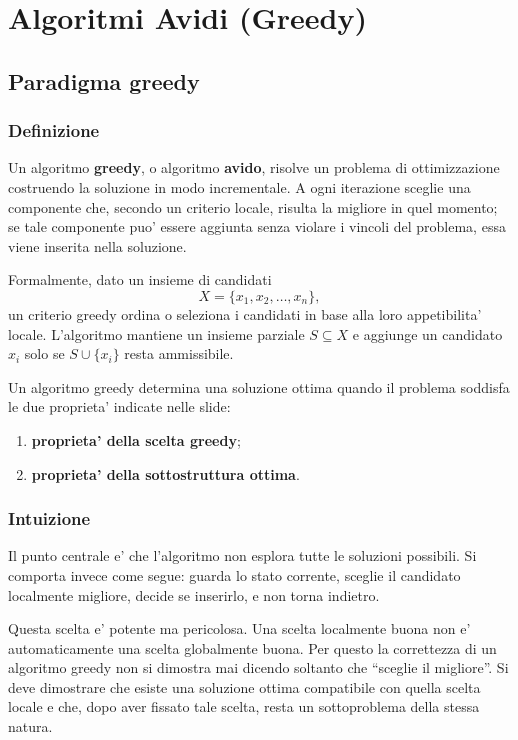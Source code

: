 \section{Algoritmi Avidi (Greedy)}

\subsection{Paradigma greedy}

\subsubsection{Definizione}
Un algoritmo \textbf{greedy}, o algoritmo \textbf{avido}, risolve un problema di ottimizzazione costruendo la soluzione in modo incrementale. A ogni iterazione sceglie una componente che, secondo un criterio locale, risulta la migliore in quel momento; se tale componente puo' essere aggiunta senza violare i vincoli del problema, essa viene inserita nella soluzione.

Formalmente, dato un insieme di candidati
\[
X=\{x_1,x_2,\ldots,x_n\},
\]
un criterio greedy ordina o seleziona i candidati in base alla loro appetibilita' locale. L'algoritmo mantiene un insieme parziale $S\subseteq X$ e aggiunge un candidato $x_i$ solo se $S\cup\{x_i\}$ resta ammissibile.

Un algoritmo greedy determina una soluzione ottima quando il problema soddisfa le due proprieta' indicate nelle slide:
\begin{enumerate}
	\item \textbf{proprieta' della scelta greedy};
	\item \textbf{proprieta' della sottostruttura ottima}.
\end{enumerate}

\subsubsection{Intuizione}
Il punto centrale e' che l'algoritmo non esplora tutte le soluzioni possibili. Si comporta invece come segue: guarda lo stato corrente, sceglie il candidato localmente migliore, decide se inserirlo, e non torna indietro.

Questa scelta e' potente ma pericolosa. Una scelta localmente buona non e' automaticamente una scelta globalmente buona. Per questo la correttezza di un algoritmo greedy non si dimostra mai dicendo soltanto che ``sceglie il migliore''. Si deve dimostrare che esiste una soluzione ottima compatibile con quella scelta locale e che, dopo aver fissato tale scelta, resta un sottoproblema della stessa natura.

